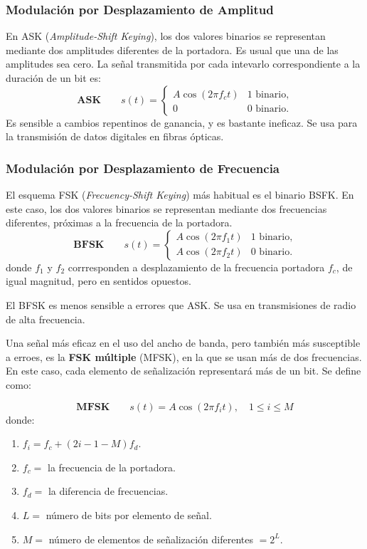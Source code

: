 \documentclass[10pt,a4paper]{article}
\begin{document}
\subsubsection{Modulación por Desplazamiento de Amplitud}
En ASK (\textit{Amplitude-Shift Keying}), los dos valores binarios se representan mediante dos amplitudes diferentes de la portadora. Es usual que una de las amplitudes sea cero. La señal transmitida por cada intevarlo correspondiente a la duración de un bit es:
\[\mathbf{ASK} \qquad
 s(t) = \begin{cases}
        A \cos(2\pi f_c t)  & \text{1 binario,}\\
        0 & \text{0 binario.}
        \end{cases}
\]
Es sensible a cambios repentinos de ganancia, y es bastante ineficaz. Se usa para la transmisión de datos digitales en fibras ópticas.

\subsubsection{Modulación por Desplazamiento de Frecuencia}
El esquema FSK (\textit{Frecuency-Shift Keying}) más habitual es el binario BSFK. En este caso, los dos valores binarios se representan mediante dos frecuencias diferentes, próximas a la frecuencia de la portadora.
\[\mathbf{BFSK} \qquad
 s(t) = \begin{cases}
        A \cos(2\pi f_1 t)  & \text{1 binario,}\\
        A \cos(2\pi f_2 t) & \text{0 binario.}
        \end{cases}
\]
donde $f_1$ y $f_2$ corrresponden a desplazamiento de la frecuencia portadora $f_c$, de igual magnitud, pero en sentidos opuestos.

El BFSK es menos sensible a errores que ASK. Se usa en transmisiones de radio de alta frecuencia.

Una señal más eficaz en el uso del ancho de banda, pero también más susceptible a erroes, es la \textbf{FSK múltiple} (MFSK), en la que se usan más de dos frecuencias. En este caso, cada elemento de señalización representará más de un bit. Se define como:

\[\mathbf{MFSK} \qquad
 s(t) =  A \cos(2\pi f_i t), \quad 1\leq i \leq M
\]
donde:
\begin{enumerate}[ ]
\item $f_i=f_c+(2i - 1 -M)f_d$.
\item $f_c=$ la frecuencia de la portadora.
\item $f_d=$ la diferencia de frecuencias.
\item $L=$ número de bits por elemento de señal.
\item $M=$ número de elementos de señalización diferentes $=2^L$.
\end{enumerate}
\end{document}
